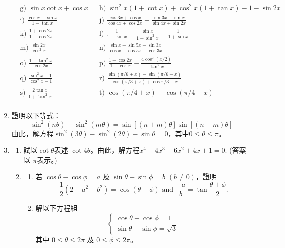\documentclass[12pt]{article}
\begin{document}
\begin{enumerate}
\begin{align*}
            &\textrm{g) } \sin{x}\cot{x}+\cos{x} && \textrm{h) } \sin^2{x}(1+\cot{x})+\cos^2{x}(1+\tan{x})-1-\sin{2x}\\
            &\textrm{i) } \frac{\cos{x}-\sin{x}}{1-\tan{x}} && \textrm{j) } \frac{\cos{3x}+\cos{x}}{\cos{4x}+\cos{2x}}+\frac{\sin{3x}+\sin{x}}{\sin{4x}+\sin{2x}}\\
            &\textrm{k) } \frac{1+\cos{2x}}{1-\cos{2x}} && \textrm{l) } \frac{1}{1-\sin{x}}-\frac{\sin{x}}{1-\sin^2{x}}-\frac{1}{1+\sin{x}}\\
            &\textrm{m) } \frac{\sin{2x}}{\cos^2{x}} && \textrm{n) } \frac{\sin{x}+\sin{5x}-\sin{3x}}{\cos{x}+\cos{5x}-\cos{3x}}\\
            &\textrm{o) } \frac{1-\tan^2{x}}{\cos{2x}} && \textrm{p) } \frac{1+\cos{2x}}{1-\cos{x}}-\frac{4\cos^2{(x/2)}}{\tan^2{x}}\\
            &\textrm{q) } \frac{\sin^2{x}-1}{\cos^2{x}-1} && \textrm{r) } \frac{\sin(\pi/6+x)-\sin(\pi/6-x)}{\cos(\pi/3+x)+\cos{\pi/3-x}}\\
            &\textrm{s) } \frac{2\tan{x}}{1+\tan^2{x}} && \textrm{t) } \cos(\pi/4+x)-\cos(\pi/4-x)\\
        \end{align*}
        \item 證明以下等式：$$\sin^2(n\theta)-\sin^2(m\theta)=\sin[(n+m)\theta]\sin[(n-m)\theta]$$由此，解方程$\sin^2(3\theta)-\sin^2(2\theta)-\sin{\theta}=0$，其中$0\leq \theta\leq \pi$。
        \item \begin{enumerate}
            \item 試以$\cot{\theta}$表述 $\cot{4\theta}$。由此，解方程$x^4-4x^3-6x^2+4x+1=0$. (答案以 $\pi$表示。)
            \item \begin{enumerate}
                \item 若 $\cos{\theta}-\cos{\phi}=a$ 及 $\sin{\theta}-\sin{\phi}=b$ $(b\neq 0)$，證明 $$\frac{1}{2}(2-a^2-b^2)=\cos{(\theta-\phi)}\textrm{ and }\frac{-a}{b}=\tan{\frac{\theta+\phi}{2}}.$$
                \item 解以下方程組 $$\begin{cases}
                    \cos{\theta}-\cos{\phi}=1\\
                    \sin{\theta}-\sin{\phi}=\sqrt{3}
                \end{cases}$$
                其中 $0\leq \theta \leq 2\pi$ 及 $0\leq \phi \leq 2\pi$。
            \end{enumerate}

\end{enumerate}
\end{enumerate}
\end{document}
